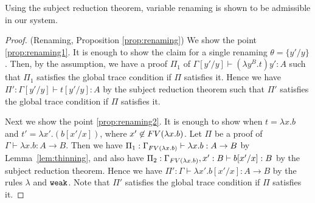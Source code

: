 Using the subject reduction theorem, variable renaming is shown to be admissible in our system. 



\begin{proof}(Renaming, Proposition \ref{prop:renaming})
  We show the point \ref{prop:renaming1}. 
  It is enough to show the claim for a single renaming $\theta = \{y'/y\}$.
  Then, by the assumption, we have a proof $\Pi_1$ of $\Gamma[y'/y] \vdash (\lambda y^B.t)y':A$
  such that $\Pi_1$ satisfies the global trace condition if $\Pi$ satisfies it.  
  Hence we have $\Pi': \Gamma[y'/y] \vdash t[y'/y]:A$ by the subject reduction theorem
  such that $\Pi'$ satisfies the global trace condition if $\Pi$ satisfies it.

  Next we show the point \ref{prop:renaming2}.
  It is enough to show when $t = \lambda x.b$ and $t' = \lambda x'.(b[x'/x])$, where $x'\not\in{{\relax FV}}(\lambda x.b)$. 
  Let $\Pi$ be a proof of $\Gamma\vdash \lambda x.b:A\to B$.
  Then we have $\Pi_1: \Gamma_{{{\relax FV}}(\lambda x.b)} \vdash \lambda x.b:A\to B$
  by Lemma~\ref{lem:thinning}, and
  also have $\Pi_2: \Gamma_{{{\relax FV}}(\lambda x.b)},x':B \vdash b[x'/x]:B$
  by the subject reduction theorem. 
  Hence we have $\Pi': \Gamma \vdash \lambda x'.b[x'/x]:A\to B$ by the rules $\lambda$ and ${\tt weak}$. 
  Note that $\Pi'$ satisfies the global trace condition if $\Pi$ satisfies it. 
\end{proof}





%
%


